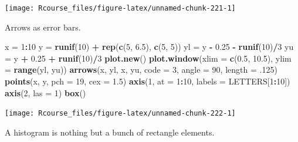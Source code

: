 \documentclass[]{book}
\newenvironment{Shaded}{\begin{snugshade}}{\end{snugshade}}
\newcommand{\KeywordTok}[1]{\textcolor[rgb]{0.13,0.29,0.53}{\textbf{#1}}}
\newcommand{\DataTypeTok}[1]{\textcolor[rgb]{0.13,0.29,0.53}{#1}}
\newcommand{\DecValTok}[1]{\textcolor[rgb]{0.00,0.00,0.81}{#1}}
\newcommand{\FloatTok}[1]{\textcolor[rgb]{0.00,0.00,0.81}{#1}}
\newcommand{\StringTok}[1]{\textcolor[rgb]{0.31,0.60,0.02}{#1}}
\newcommand{\OperatorTok}[1]{\textcolor[rgb]{0.81,0.36,0.00}{\textbf{#1}}}
\newcommand{\NormalTok}[1]{#1}
\theoremstyle{definition}
\theoremstyle{definition}
\theoremstyle{definition}
\theoremstyle{remark}
\begin{document}
\texttt{[image: Rcourse\_files/figure-latex/unnamed-chunk-221-1]}

Arrows as error bars.

\begin{Shaded}
\begin{Highlighting}[]
\NormalTok{x =}\StringTok{ }\DecValTok{1}\OperatorTok{:}\DecValTok{10}
\NormalTok{y =}\StringTok{ }\KeywordTok{runif}\NormalTok{(}\DecValTok{10}\NormalTok{) }\OperatorTok{+}\StringTok{ }\KeywordTok{rep}\NormalTok{(}\KeywordTok{c}\NormalTok{(}\DecValTok{5}\NormalTok{, }\FloatTok{6.5}\NormalTok{), }\KeywordTok{c}\NormalTok{(}\DecValTok{5}\NormalTok{, }\DecValTok{5}\NormalTok{))}
\NormalTok{yl =}\StringTok{ }\NormalTok{y }\OperatorTok{-}\StringTok{ }\FloatTok{0.25} \OperatorTok{-}\StringTok{ }\KeywordTok{runif}\NormalTok{(}\DecValTok{10}\NormalTok{)}\OperatorTok{/}\DecValTok{3}
\NormalTok{yu =}\StringTok{ }\NormalTok{y }\OperatorTok{+}\StringTok{ }\FloatTok{0.25} \OperatorTok{+}\StringTok{ }\KeywordTok{runif}\NormalTok{(}\DecValTok{10}\NormalTok{)}\OperatorTok{/}\DecValTok{3}
\KeywordTok{plot.new}\NormalTok{()}
\KeywordTok{plot.window}\NormalTok{(}\DataTypeTok{xlim =} \KeywordTok{c}\NormalTok{(}\FloatTok{0.5}\NormalTok{, }\FloatTok{10.5}\NormalTok{), }\DataTypeTok{ylim =} \KeywordTok{range}\NormalTok{(yl, yu))}
\KeywordTok{arrows}\NormalTok{(x, yl, x, yu, }\DataTypeTok{code =} \DecValTok{3}\NormalTok{, }\DataTypeTok{angle =} \DecValTok{90}\NormalTok{, }\DataTypeTok{length =}\NormalTok{ .}\DecValTok{125}\NormalTok{)}
\KeywordTok{points}\NormalTok{(x, y, }\DataTypeTok{pch =} \DecValTok{19}\NormalTok{, }\DataTypeTok{cex =} \FloatTok{1.5}\NormalTok{)}
\KeywordTok{axis}\NormalTok{(}\DecValTok{1}\NormalTok{, }\DataTypeTok{at =} \DecValTok{1}\OperatorTok{:}\DecValTok{10}\NormalTok{, }\DataTypeTok{labels =}\NormalTok{ LETTERS[}\DecValTok{1}\OperatorTok{:}\DecValTok{10}\NormalTok{])}
\KeywordTok{axis}\NormalTok{(}\DecValTok{2}\NormalTok{, }\DataTypeTok{las =} \DecValTok{1}\NormalTok{)}
\KeywordTok{box}\NormalTok{()}
\end{Highlighting}
\end{Shaded}

\texttt{[image: Rcourse\_files/figure-latex/unnamed-chunk-222-1]}

A histogram is nothing but a bunch of rectangle elements.
\end{document}
